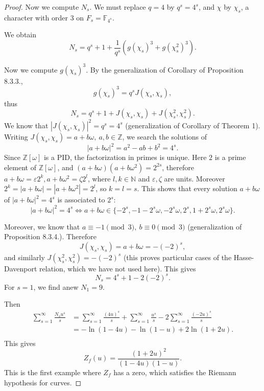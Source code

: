 \documentclass[11pt,a4paper]{article}
\newcommand{\Z}{\mathbb{Z}}
\newcommand{\N}{\mathbb{N}}
\newcommand{\F}{\mathbb{F}}
\begin{document}
\begin{proof}
Now we compute $N_s$. We must replace $q =4$ by $q^s = 4^s$, and $\chi$ by $\chi_s$, a character with order 3 on $F_s = \F_{4^s}$.

We obtain
$$N_s = q^s + 1 + \frac{1}{q^s} \left (g(\chi_s)^3 + g(\chi_s^2)^3 \right).$$

Now we compute $g(\chi_s)^3$. By the generalization of Corollary of Proposition 8.3.3., 
$$g(\chi_s)^3 = q^s J(\chi_s,\chi_s),$$
thus
$$N_s = q^s + 1 +  J(\chi_s,\chi_s) + J(\chi_s^2,\chi_s^2) .
$$
We know that $|J(\chi_s,\chi_s)|^2 = q^s = 4^s$ (generalization of Corollary of Theorem 1). Writing $J(\chi_s,\chi_s) = a+ b \omega,\ a,b\in \Z$, we search the solutions of
$$|a+ b \omega|^2 = a^2 - ab + b^2 = 4^s.$$
Since $\Z[\omega]$ is a PID, the factorization in primes is unique. Here $2$ is a prime element of $\Z[\omega]$, and $(a+b \omega)(a+b \omega^2) = 2^{2s}$, therefore $a+b \omega =\varepsilon 2^k, a+b \omega^2 = \zeta 2^l$, where $l,k \in \N$ and $\varepsilon, \zeta$ are units. Moreover $2^k = |a+ b \omega| = |a+b \omega^2| = 2^l$, so $k = l = s$. This shows that every solution $a+ b \omega$ of $|a+ b \omega|^2  =4^s$ is associated to $2^s$:
$$|a+ b \omega|^2  =4^s \iff a+b \omega \in \{-2^s, -1 - 2^s \omega, -2^s \omega, 2^s, 1 + 2^s \omega, 2^s \omega\}.$$

Moreover, we know that $a \equiv -1 \pmod 3,\ b \equiv 0 \pmod 3$ (generalization of Proposition 8.3.4.). Therefore $$J(\chi_s,\chi_s) = a + b \omega = -(-2)^s,$$
and similarly $J(\chi_s^2,\chi_s^2) = -(-2)^s$ (this proves particular cases of the Hasse-Davenport relation, which we have not used here).  This gives
$$N_s = 4^s + 1 -2 (-2)^{s}.$$
For $s = 1$, we find anew $N_1 = 9$.

Then 
\begin{align*}
\sum_{s=1}^\infty \frac{N_s u^s}{s} &= \sum_{s=1}^\infty \frac{(4u)^s}{s}  + \sum_{s=1}^\infty \frac{u^s}{s} - 2 \sum_{s=1}^\infty \frac{(-2u)^s}{s}\\
&= - \ln(1-4u) - \ln(1-u) + 2 \ln(1+2u).\\
\end{align*}
This gives
$$Z_f(u) = \frac{(1+2u)^2}{(1-4u)(1-u)}.$$
This is the first example where $Z_f$ has a zero, which satisfies the Riemann hypothesis for curves.
\end{proof}
\end{document}
